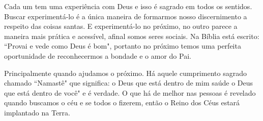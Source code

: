\emdash{}Cada um tem uma experiência com Deus e isso é sagrado em todos os sentidos. Buscar experimentá-lo é a única maneira de formarmos nosso discernimento a respeito das coisas santas. E experimentá-lo no próximo, no outro parece a maneira mais prática e acessível, afinal somos seres sociais. Na Bíblia está escrito: ``Provai e vede como Deus é bom", portanto no próximo temos uma perfeita oportunidade de reconhecermos a bondade e o amor do Pai.

\emdash{}Principalmente quando ajudamos o próximo. Há aquele cumprimento sagrado chamado ``Namastê" que significa: o Deus que está dentro de mim saúde o Deus que está dentro de você" e é verdade. O que há de melhor nas pessoas é revelado quando buscamos o céu e se todos o fizerem, então o Reino dos Céus estará implantado na Terra.